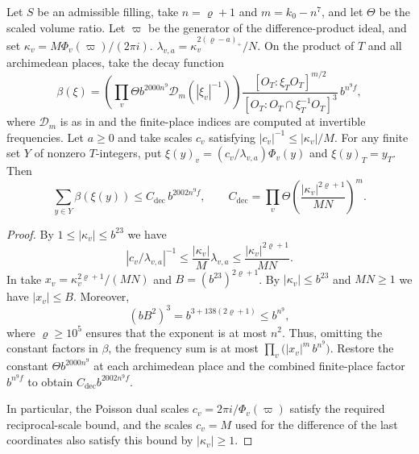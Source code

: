 \begin{lemma}
\label{lem:b-global-frequency-decay}
\emitthmsource
Let $S$ be an admissible filling, take $n=\varrho+1$ and $m=k_0-n^7$, and let $\Theta$ be the scaled volume ratio.
Let $\varpi$ be the generator of the difference-product ideal, and set $\kappa_v=M\Phi_v(\varpi)/(2\pi i)$.
$\lambda_{v,a}=\kappa_v^{2(\varrho-a)_+}/N$.
On the product of $T$ and all archimedean places, take the decay function
\[
 \beta(\xi)=
 \left(\prod_v\Theta b^{2000n^9}\mathcal D_m(|\xi_v|^{-1})\right)
 \frac{[O_T:\xi_TO_T]^{m/2}}{[O_T:O_T\cap\xi_T^{-1}O_T]^3}\,b^{n^9 f},
\]
where $\mathcal D_m$ is as in  and the finite-place indices are computed at invertible frequencies.
Let $a\ge0$ and take scales $c_v$ satisfying $|c_v|^{-1}\le|\kappa_v|/M$.
For any finite set $Y$ of nonzero $T$-integers, put
$\xi(y)_v=(c_v/\lambda_{v,a})\Phi_v(y)$ and $\xi(y)_T=y_T$. Then
\[
 \sum_{y\in Y}\beta(\xi(y))
 \le C_{\mathrm{dec}}\,b^{2002n^9 f},\qquad
 C_{\mathrm{dec}}=\prod_v\Theta
          \left(\frac{|\kappa_v|^{2\varrho+1}}{MN}\right)^m .
\]
\end{lemma}
\begin{proof}
By $1\le|\kappa_v|\le b^{23}$ we have
\[
 |c_v/\lambda_{v,a}|^{-1}
 \le \frac{|\kappa_v|}{M}\lambda_{v,a}
 \le \frac{|\kappa_v|^{2\varrho+1}}{MN}.
\]
In  take
$x_v=\kappa_v^{2\varrho+1}/(MN)$ and $B=(b^{23})^{2\varrho+1}$.
By $|\kappa_v|\le b^{23}$ and $MN\ge1$ we have $|x_v|\le B$. Moreover,
\[
 (bB^2)^3=b^{3+138(2\varrho+1)}\le b^{n^9},
\]
where $\varrho\ge10^5$ ensures that the exponent is at most $n^2$.
Thus, omitting the constant factors in $\beta$, the frequency sum is at most
$\prod_v \bigl(|x_v|^m\,b^{n^9}\bigr)$.
Restore the constant $\Theta b^{2000n^9}$ at each archimedean place and the combined finite-place factor
$b^{n^9f}$ to obtain $C_{\mathrm{dec}}b^{2002n^9f}$.

In particular, the Poisson dual scales $c_v=2\pi i/\Phi_v(\varpi)$ satisfy the required reciprocal-scale bound,
and the scales $c_v=M$ used for the difference of the last coordinates also satisfy this bound by $|\kappa_v|\ge1$.
\end{proof}

